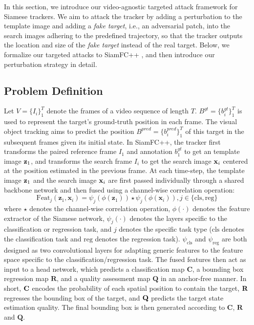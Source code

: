 \documentclass[journal]{IEEEtran}
\begin{document}
In this section, we introduce our video-agnostic targeted attack framework for Siamese trackers. We aim to attack the tracker by adding a perturbation to the template image and adding a \textit{fake target}, i.e., an adversarial patch, into the search images adhering to the predefined trajectory, so that the tracker outputs the location and size of the \textit{fake target} instead of the real target. Below, we formalize our targeted attacks to SiamFC++ \cite{SiamFC++}, and then introduce our perturbation strategy in detail.
 
\subsection{Problem Definition}

Let $V=\{I_i\}_1^T$ denote the frames of a video sequence of length $T$. $B^{gt}=\{b^{gt}_i\}_1^T$ is used to represent the target's ground-truth position in each frame. The visual object tracking aims to predict the position $B^{pred}=\{b^{pred}_i\}_1^T$ of this target in the subsequent frames given its initial state. In SiamFC++, the tracker first transforms the paired reference frame $I_1$ and annotation $b_1^{gt}$ to get an template image $\textbf z_1$, and transforms the search frame $I_i$ to get the search image $\textbf x_i$ centered at the position estimated in the previous frame. At each time-step, the template image $\textbf z_1$ and the search image $\textbf x_i$ are first passed individually through a shared backbone network and then fused using a channel-wise correlation operation:
\begin{equation}
  \text{Feat}_{j}(\mathbf{z}_1, \mathbf{x}_i)=\psi_{j}(\phi(\mathbf{z}_1)) \star \psi_{j}(\phi(\mathbf{x}_i)), j \in\{\mathrm{cls}, \mathrm{reg}\}
\end{equation}
where $\star$ denotes the channel-wise correlation operation, $\phi(\cdot)$ denotes the feature extractor of the Siamese network, $\psi_j(\cdot)$ denotes the layers specific to the classification or regression task, and $j$ denotes the specific task type ($\mathrm{cls}$ denotes the classification task and $\mathrm{reg}$ denotes the regression task). $\psi_{\mathrm{cls}}$ and $\psi_{\mathrm{reg}}$ are both designed as two convolutional layers for adapting generic features to the feature space specific to the classification/regression task. The fused features then act as input to a head network, which predicts a classification map $\textbf{C}$, a bounding box regression map $\textbf{R}$, and a quality assessment map $\textbf{Q}$ in an anchor-free manner. In short, $\textbf C$ encodes the probability of each spatial position to contain the target, $\textbf R$ regresses the bounding box of the target, and $\textbf Q$ predicts the target state estimation quality. The final bounding box is then generated according to $\textbf{C}$, $\textbf{R}$ and $\textbf{Q}$.
\end{document}

